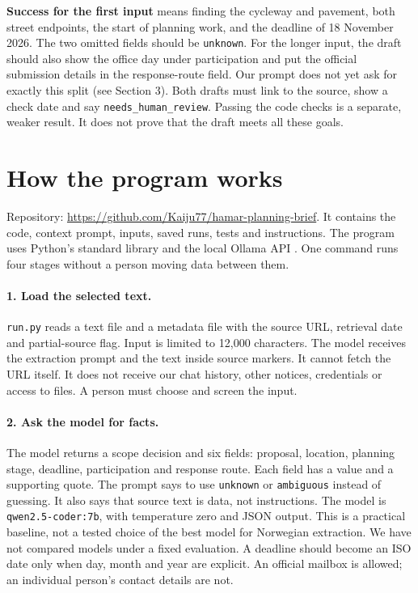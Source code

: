 \documentclass{article}
\begin{document}
\textbf{Success for the first input} means finding the cycleway and pavement, both
street endpoints, the start of planning work, and the deadline of 18 November
2026. The two omitted fields should be \texttt{unknown}. For the longer input,
the draft should also show the office day under participation and put the official
submission details in the response-route field. Our prompt does not yet ask for exactly
this split (see Section 3). Both drafts must link to the source, show a check
date and say \texttt{needs\_human\_review}. Passing the code checks is a separate,
weaker result. It does not prove that the draft meets all these goals.

\section{How the program works}
Repository: \url{https://github.com/Kaiju77/hamar-planning-brief}.
It contains the code, context prompt, inputs, saved runs, tests and instructions.
The program uses Python's standard library and the local Ollama API \citep{ollama}.
One command runs four stages without a person moving data between them.

\paragraph{1. Load the selected text.}
\texttt{run.py} reads a text file and a metadata file with the source URL, retrieval
date and partial-source flag. Input is limited to 12,000 characters. The model
receives the extraction prompt and the text inside source markers. It cannot
fetch the URL itself. It does not receive our chat history, other notices,
credentials or access to files. A person must choose and screen the input.

\paragraph{2. Ask the model for facts.}
The model returns a scope decision and six fields: proposal, location, planning
stage, deadline, participation and response route. Each field has a value and a
supporting quote. The prompt says to use \texttt{unknown} or \texttt{ambiguous}
instead of guessing. It also says that source text is data, not instructions.
The model is \texttt{qwen2.5-coder:7b}, with temperature zero and JSON output.
This is a practical baseline, not a tested choice of the best model for Norwegian
extraction. We have not compared models under a fixed evaluation.
A deadline should become an ISO date only when day, month and year are explicit.
An official mailbox is allowed; an individual person's contact details are not.
\end{document}
